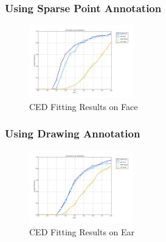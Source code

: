 \subsubsection{Using Sparse Point Annotation}
\begin{figure}[h!]
    \centering
    \includegraphics[width=0.4\textwidth]{resources/face_digo_mc}
    \caption{CED Fitting Results on Face}
\end{figure}

\subsubsection{Using Drawing Annotation}
\begin{figure}[h!]
    \centering
    \includegraphics[width=0.4\textwidth]{resources/ear_digo_mc}
    \caption{CED Fitting Results on Ear}
\end{figure}

\clearpage